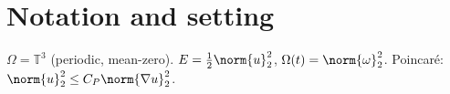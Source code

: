 \section{Notation and setting}
$\Omega=\mathbb{T}^3$ (periodic, mean-zero). $E=\tfrac12\norm{u}_2^2$, $\Omega(t)=\norm{\omega}_2^2$. Poincar\'e: $\norm{u}_2^2\le C_P \norm{\nabla u}_2^2$.

